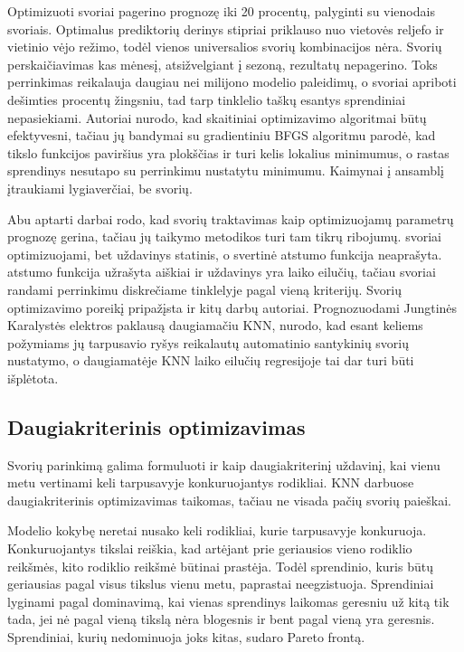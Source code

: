 \documentclass[]{VUMIFTemplateClass}
\begin{document}
    Optimizuoti svoriai pagerino prognozę iki 20 procentų, palyginti su vienodais svoriais.
    Optimalus prediktorių derinys stipriai priklauso nuo vietovės reljefo ir vietinio vėjo režimo, todėl vienos universalios svorių kombinacijos nėra.
    Svorių perskaičiavimas kas mėnesį, atsižvelgiant į sezoną, rezultatų nepagerino.
    Toks perrinkimas reikalauja daugiau nei milijono modelio paleidimų, o svoriai apriboti dešimties procentų žingsniu, tad tarp tinklelio taškų esantys sprendiniai nepasiekiami.
    Autoriai nurodo, kad skaitiniai optimizavimo algoritmai būtų efektyvesni, tačiau jų bandymai su gradientiniu BFGS algoritmu parodė, kad tikslo funkcijos paviršius yra plokščias ir turi kelis lokalius minimumus, o rastas sprendinys nesutapo su perrinkimu nustatytu minimumu.
    Kaimynai į ansamblį įtraukiami lygiaverčiai, be svorių.

    Abu aptarti darbai rodo, kad svorių traktavimas kaip optimizuojamų parametrų prognozę gerina, tačiau jų taikymo metodikos turi tam tikrų ribojumų.
    \cite{jafarizadeh2022} svoriai optimizuojami, bet uždavinys statinis, o svertinė atstumo funkcija neaprašyta.
    \cite{junk2015} atstumo funkcija užrašyta aiškiai ir uždavinys yra laiko eilučių, tačiau svoriai randami perrinkimu diskrečiame tinklelyje pagal vieną kriterijų.
    Svorių optimizavimo poreikį pripažįsta ir kitų darbų autoriai.
    Prognozuodami Jungtinės Karalystės elektros paklausą daugiamačiu KNN, \cite{alqahtani2013} nurodo, kad esant keliems požymiams jų tarpusavio ryšys reikalautų automatinio santykinių svorių nustatymo, o daugiamatėje KNN laiko eilučių regresijoje tai dar turi būti išplėtota.


    \subsection{Daugiakriterinis optimizavimas}

    Svorių parinkimą galima formuluoti ir kaip daugiakriterinį uždavinį, kai vienu metu vertinami keli tarpusavyje konkuruojantys rodikliai.
    KNN darbuose daugiakriterinis optimizavimas taikomas, tačiau ne visada pačių svorių paieškai.

    Modelio kokybę neretai nusako keli rodikliai, kurie tarpusavyje konkuruoja.
    Konkuruojantys tikslai reiškia, kad artėjant prie geriausios vieno rodiklio reikšmės, kito rodiklio reikšmė būtinai prastėja.
    Todėl sprendinio, kuris būtų geriausias pagal visus tikslus vienu metu, paprastai neegzistuoja.
    Sprendiniai lyginami pagal dominavimą, kai vienas sprendinys laikomas geresniu už kitą tik tada, jei nė pagal vieną tikslą nėra blogesnis ir bent pagal vieną yra geresnis.
    Sprendiniai, kurių nedominuoja joks kitas, sudaro Pareto frontą.
\end{document}
